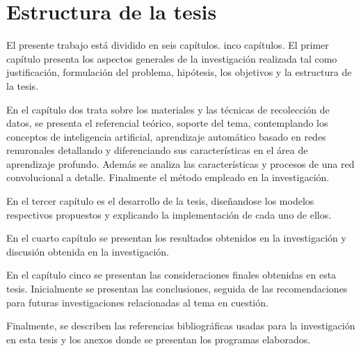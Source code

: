 \section{Estructura de la tesis}

	\vskip 0.1cm
	El presente trabajo está dividido en seis capítulos. inco capítulos. El primer capítulo presenta los aspectos generales de la investigación realizada tal como justificación, formulación del problema, hipótesis, los objetivos y la estructura de la tesis.

	En el capítulo dos trata sobre los materiales y las técnicas de recolección de datos, se presenta el referencial teórico, soporte del tema, contemplando los conceptos de inteligencia artificial, aprendizaje automático basado en redes renuronales detallando y diferenciando sus características en el área de aprendizaje profundo. Además se analiza las características y procesos de una red convolucional a detalle. Finalmente el método empleado en la investigación.

	En el tercer capítulo es el desarrollo de la tesis, diseñandose los modelos respectivos propuestos y explicando la implementación de cada uno de ellos.
	
	En el cuarto capítulo se presentan los resultados obtenidos en la investigación y discusión obtenida en la investigación.

	En el capítulo cinco se presentan las consideraciones finales obtenidas en esta tesis. Inicialmente se presentan las conclusiones, seguida de las recomendaciones para futuras investigaciones relacionadas al tema en cuestión.

	Finalmente, se describen las referencias bibliográficas usadas para la investigación en esta tesis y los anexos donde se presentan los programas elaborados.

